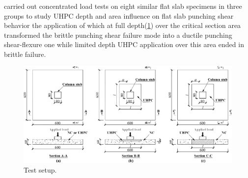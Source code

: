 \cite{qi2021} carried out concentrated load tests on eight similar flat slab specimens in three groups to study UHPC depth and area influence on flat slab punching shear behavior the application of which at full depth(\ref{q2021f1}) over the critical section area transformed the brittle punching shear failure mode into a ductile punching shear-flexure one while limited depth UHPC application over this area ended in brittle failure. 
\begin{figure}\centering
    \includegraphics[width=\columnwidth]{Figures/q2021f1.pdf}\caption{Test setup\citep{qi2021}.}\label{q2021f1}
    \end{figure}
    
